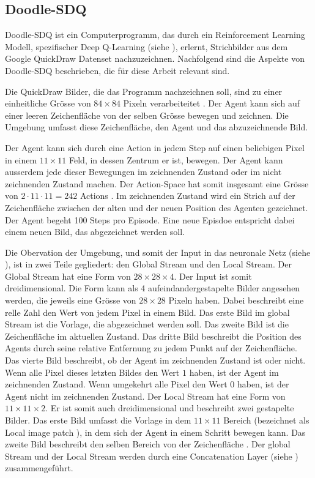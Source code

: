 \subsection{Doodle-SDQ}\label{sub:t_ver_dood} Doodle-SDQ ist ein
Computerprogramm, das durch ein Reinforcement Learning Modell, spezifischer Deep
Q-Learning (siehe ), erlernt, Strichbilder aus dem Google
QuickDraw Datenset \cite{noauthor_quick_2022} %
nachzuzeichnen. Nachfolgend sind die Aspekte von Doodle-SDQ beschrieben, die für
diese Arbeit relevant sind.

Die QuickDraw Bilder, die das Programm nachzeichnen soll, sind zu einer
einheitliche Grösse von $84\times84$ Pixeln verarbeiteitet \cite[S.
7]{zhou_learning_2018}. Der Agent kann sich auf einer leeren Zeichenfläche von
der selben Grösse bewegen und zeichnen. Die Umgebung umfasst diese
Zeichenfläche, den Agent und das abzuzeichnende Bild.

Der Agent kann sich durch eine Action in jedem Step auf einen beliebigen Pixel
in einem $11\times11$ Feld, in dessen Zentrum er ist, bewegen. Der Agent kann
ausserdem jede dieser Bewegungen im zeichnenden Zustand oder im nicht
zeichnenden Zustand machen. Der Action-Space hat somit insgesamt eine Grösse von
$2\cdot11\cdot11 = 242$ Actions \cite[S. 5]{zhou_learning_2018}. Im zeichnenden
Zustand wird ein Strich auf der Zeichenfläche zwischen der alten und der neuen
Position des Agenten gezeichnet. Der Agent begeht 100 Steps pro Episode. Eine
neue Episdoe entspricht dabei einem neuen Bild, das abgezeichnet werden soll.

Die Obervation der Umgebung, und somit der Input in das neuronale Netz (siehe
), ist in zwei Teile gegliedert: den Global Stream und
den Local Stream. Der Global Stream hat eine Form von $28\times28\times4$. Der
Input ist somit dreidimensional. Die Form kann als 4 aufeindandergestapelte
Bilder angesehen werden, die jeweils eine Grösse von $28\times28$ Pixeln haben.
Dabei beschreibt eine relle Zahl den Wert von jedem Pixel in einem Bild. Das
erste Bild im global Stream ist die Vorlage, die abgezeichnet werden soll. Das
zweite Bild ist die Zeichenfläche im aktuellen Zustand. Das dritte Bild
beschreibt die Position des Agents durch seine relative Entfernung zu jedem
Punkt auf der Zeichenfläche. Das vierte Bild beschreibt, ob der Agent im
zeichnenden Zustand ist oder nicht. Wenn alle Pixel dieses letzten Bildes den
Wert $1$ haben, ist der Agent im zeichnenden Zustand. Wenn umgekehrt alle Pixel
den Wert $0$ haben, ist der Agent nicht im zeichnenden Zustand. Der Local Stream
hat eine Form von $11\times11\times2$. Er ist somit auch dreidimensional und
beschreibt zwei gestapelte Bilder. Das erste Bild umfasst die Vorlage in dem
$11\times11$ Bereich (bezeichnet als Local image patch \cite[S.
5]{zhou_learning_2018}), in dem sich der Agent in einem Schritt bewegen kann.
Das zweite Bild beschreibt den selben Bereich von der Zeichenfläche \cite[S. 4
ff.]{zhou_learning_2018}. Der global Stream und der Local Stream werden durch
eine Concatenation Layer (siehe ) zusammengeführt. 

